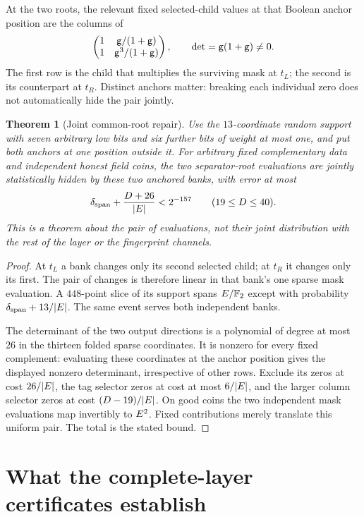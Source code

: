 \documentclass[11pt]{article}
\newtheorem{theorem}{Theorem}
\begin{document}
At the two roots, the relevant fixed selected-child values at that Boolean anchor position are the columns of
\[
 \begin{pmatrix}
 1&\mathsf{g}/(1+\mathsf{g})\\
 1&\mathsf{g}^3/(1+\mathsf{g})
 \end{pmatrix},
 \qquad \det=\mathsf{g}(1+\mathsf{g})\ne0.
\]
The first row is the child that multiplies the surviving mask at $t_L$; the second is its counterpart at $t_R$. Distinct anchors matter: breaking each individual zero does not automatically hide the pair jointly.

\begin{theorem}[Joint common-root repair]
Use the $13$-coordinate random support with seven arbitrary low bits and six further bits of weight at most one, and put both anchors at one position outside it. For arbitrary fixed complementary data and independent honest field coins, the two separator-root evaluations are jointly statistically hidden by these two anchored banks, with error at most
\[
 \delta_{\mathrm{span}}+\frac{D+26}{|E|}<2^{-157}
 \qquad(19\le D\le40).
\]
This is a theorem about the pair of evaluations, not their joint distribution with the rest of the layer or the fingerprint channels.
\end{theorem}
\begin{proof}
At $t_L$ a bank changes only its second selected child; at $t_R$ it changes only its first. The pair of changes is therefore linear in that bank's one sparse mask evaluation. A $448$-point slice of its support spans $E/\mathbb{F}_2$ except with probability $\delta_{\mathrm{span}}+13/|E|$. The same event serves both independent banks.

The determinant of the two output directions is a polynomial of degree at most $26$ in the thirteen folded sparse coordinates. It is nonzero for every fixed complement: evaluating these coordinates at the anchor position gives the displayed nonzero determinant, irrespective of other rows. Exclude its zeros at cost $26/|E|$, the tag selector zeros at cost at most $6/|E|$, and the larger column selector zeros at cost $(D-19)/|E|$. On good coins the two independent mask evaluations map invertibly to $E^2$. Fixed contributions merely translate this uniform pair. The total is the stated bound.
\end{proof}

\section{What the complete-layer certificates establish}
\end{document}
